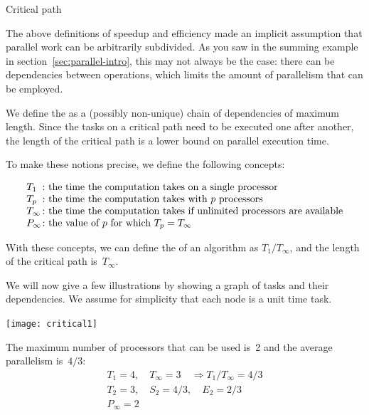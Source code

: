  {Critical path}
\label{sec:critical-path}

The above definitions of speedup and efficiency made an implicit assumption
that parallel work can be arbitrarily subdivided.
As you saw in the summing example in section~\ref{sec:parallel-intro},
this may not always be the case: there can be dependencies between
operations, which limits the amount of parallelism that can be
employed.

We define the  as a (possibly non-unique) chain of dependencies
of maximum length. Since the tasks on a critical path need to be
executed one after another, the length of the critical path is a lower
bound on parallel execution time.

To make these notions precise, we define the following concepts:
\begin{definition}
  \[ 
  \begin{array}{l@{\colon}l}
    T_1&\hbox{the time the computation takes on a single processor}\\
    T_p&\hbox{the time the computation takes with $p$ processors}\\
    T_\infty&\hbox{the time the computation takes if unlimited processors are available}\\
    P_\infty&\hbox{the value of $p$ for which $T_p=T_\infty$}
  \end{array}  
  \]
\end{definition}
With these concepts, we can define the 
of an algorithm as $T_1/T_\infty$, and the length of the critical path is~$T_\infty$.

We will now give a few illustrations by showing a graph of tasks and their dependencies.
We assume for simplicity that each node is a unit time task.

\begin{minipage}{\textwidth}
  \begin{minipage}{.25\textwidth}
    \texttt{[image: critical1]}
  \end{minipage}
  \begin{minipage}{.75\textwidth}
    The maximum number of processors that can be used is~2 and the
    average parallelism is~$4/3$:
    \[
    \begin{array}{l}
      T_1=4,\quad T_\infty=3 \quad\Rightarrow T_1/T_\infty=4/3\\
      T_2=3,\quad S_2=4/3,\quad E_2=2/3\\
      P_\infty=2
    \end{array}
    \]
  \end{minipage}
\end{minipage}

